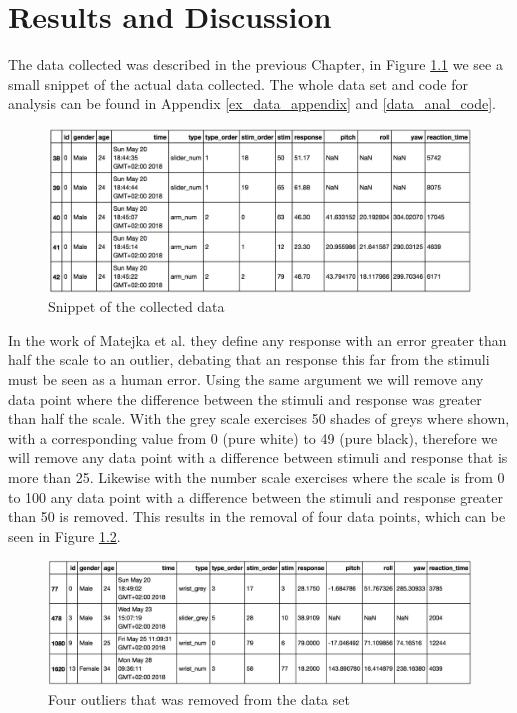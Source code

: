 \chapter{Results and Discussion}\label{res_and_dis}\label{res_and_dis_ch}

The data collected was described in the previous Chapter, in Figure \ref{data_snip} we see a small snippet of the actual data collected. The whole data set and code for analysis can be found in Appendix \ref{ex_data_appendix} and \ref{data_anal_code}. 

\begin{figure}[]
    \centering
    \includegraphics[width=1.2\textwidth]{figures/dataExample.png}
    \caption{Snippet of the collected data}
    \label{data_snip}
\end{figure}

In the work of Matejka et al.\cite{grey} they define any response with an error greater than half the scale to an outlier, debating that an response this far from the stimuli must be seen as a human error. Using the same argument we will remove any data point where the difference between the stimuli and response was greater than half the scale. With the grey scale exercises 50 shades of greys where shown, with a corresponding value from 0 (pure white) to 49 (pure black), therefore we will remove any data point with a difference between stimuli and response that is more than 25. Likewise with the number scale exercises where the scale is from 0 to 100 any data point with a difference between the stimuli and response greater than 50 is removed. This results in the removal of four data points, which can be seen in Figure \ref{outliers}. 

\begin{figure}[]
    \centering
    \includegraphics[width=1.2\textwidth]{figures/outliers.png}
    \caption{Four outliers that was removed from the data set}
    \label{outliers}
\end{figure}

